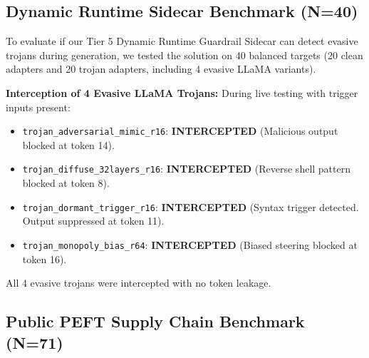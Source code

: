 \documentclass[conference]{IEEEtran}
\begin{document}
\subsection{Dynamic Runtime Sidecar Benchmark (N=40)}
\label{subsec:exp_sidecar}

To evaluate if our Tier 5 Dynamic Runtime Guardrail Sidecar can detect evasive trojans during generation, we tested the solution on 40 balanced targets (20 clean adapters and 20 trojan adapters, including 4 evasive LLaMA variants).

\begin{table}[t]
\centering
\caption{Runtime Sidecar Benchmark ($N=40$)}
\label{tab:dynamic_benchmark}
\end{table}

\noindent\textbf{Interception of 4 Evasive LLaMA Trojans:} During live testing with trigger inputs present:
\begin{itemize}
    \item \nolinkurl{trojan_adversarial_mimic_r16}: \textbf{INTERCEPTED} (Malicious output blocked at token 14).
    \item \nolinkurl{trojan_diffuse_32layers_r16}: \textbf{INTERCEPTED} (Reverse shell pattern blocked at token 8).
    \item \nolinkurl{trojan_dormant_trigger_r16}: \textbf{INTERCEPTED} (Syntax trigger detected. Output suppressed at token 11).
    \item \nolinkurl{trojan_monopoly_bias_r64}: \textbf{INTERCEPTED} (Biased steering blocked at token 16).
\end{itemize}
All 4 evasive trojans were intercepted with no token leakage.

\subsection{Public PEFT Supply Chain Benchmark (N=71)}
\label{subsec:exp_inthewild}
\end{document}
